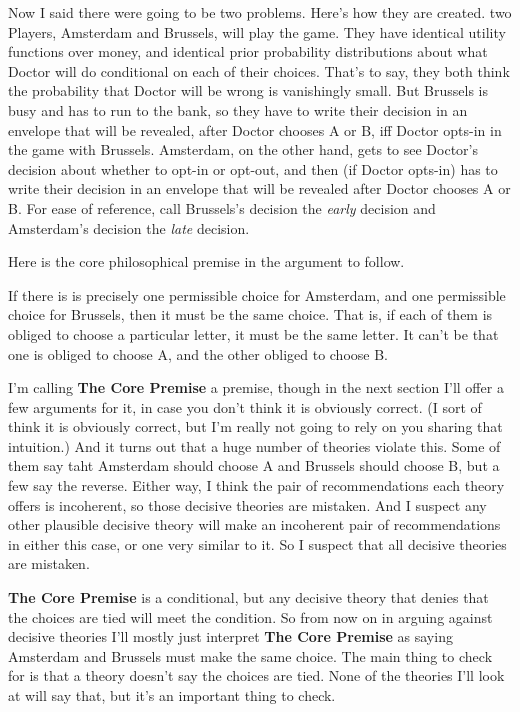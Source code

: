 \documentclass[
  12pt,
]{article}
\providecommand{\tightlist}{%
  \setlength{\itemsep}{0pt}\setlength{\parskip}{0pt}}
\begin{document}
Now I said there were going to be two problems. Here's how they are
created. two Players, Amsterdam and Brussels, will play the game. They
have identical utility functions over money, and identical prior
probability distributions about what Doctor will do conditional on each
of their choices. That's to say, they both think the probability that
Doctor will be wrong is vanishingly small. But Brussels is busy and has
to run to the bank, so they have to write their decision in an envelope
that will be revealed, after Doctor chooses A or B, iff Doctor opts-in
in the game with Brussels. Amsterdam, on the other hand, gets to see
Doctor's decision about whether to opt-in or opt-out, and then (if
Doctor opts-in) has to write their decision in an envelope that will be
revealed after Doctor chooses A or B. For ease of reference, call
Brussels's decision the \emph{early} decision and Amsterdam's decision
the \emph{late} decision.

Here is the core philosophical premise in the argument to follow.

\begin{description}
\tightlist
\item[The Core Premise]
If there is is precisely one permissible choice for Amsterdam, and one
permissible choice for Brussels, then it must be the same choice. That
is, if each of them is obliged to choose a particular letter, it must be
the same letter. It can't be that one is obliged to choose A, and the
other obliged to choose B.
\end{description}

I'm calling \textbf{The Core Premise} a premise, though in the next
section I'll offer a few arguments for it, in case you don't think it is
obviously correct. (I sort of think it is obviously correct, but I'm
really not going to rely on you sharing that intuition.) And it turns
out that a huge number of theories violate this. Some of them say taht
Amsterdam should choose A and Brussels should choose B, but a few say
the reverse. Either way, I think the pair of recommendations each theory
offers is incoherent, so those decisive theories are mistaken. And I
suspect any other plausible decisive theory will make an incoherent pair
of recommendations in either this case, or one very similar to it. So I
suspect that all decisive theories are mistaken.

\textbf{The Core Premise} is a conditional, but any decisive theory that
denies that the choices are tied will meet the condition. So from now on
in arguing against decisive theories I'll mostly just interpret
\textbf{The Core Premise} as saying Amsterdam and Brussels must make the
same choice. The main thing to check for is that a theory doesn't say
the choices are tied. None of the theories I'll look at will say that,
but it's an important thing to check.
\end{document}
